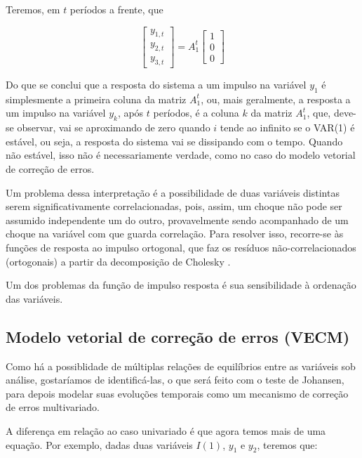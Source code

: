 \documentclass[a4paper,
               article,
               12pt,
               openany,
               oneside,
               english,
               brazil]{abntex2}
\numberwithin{equation}{section}
\begin{document}
    Teremos, em $ t $ períodos a frente, que

    \begin{equation*}
        \begin{bmatrix}
            y_{1,t} \\
            y_{2,t} \\
            y_{3,t}
        \end{bmatrix} =
        A_1^{t}
        \begin{bmatrix}
            1 \\
            0 \\
            0
        \end{bmatrix}
    \end{equation*}

    Do que se conclui que a resposta do sistema a um impulso na variável $ y_1 $ é simplesmente a primeira coluna da matriz $ A_1^{t} $, ou, mais geralmente, a resposta a um impulso na variável $ y_k $, após $ t $ períodos, é a coluna $ k $ da matriz $ A_1^{t} $, que, deve-se observar, vai se aproximando de zero quando $ i $ tende ao infinito se o VAR(1) é estável, ou seja, a resposta do sistema vai se dissipando com o tempo. Quando não estável, isso não é necessariamente verdade, como no caso do modelo vetorial de correção de erros.

   Um problema dessa interpretação é a possibilidade de duas variáveis distintas serem significativamente correlacionadas, pois, assim, um choque não pode ser assumido independente um do outro, provavelmente sendo acompanhado de um choque na variável com que guarda correlação. Para resolver isso, recorre-se às funções de resposta ao impulso ortogonal, que faz os resíduos não-correlacionados (ortogonais) a partir da decomposição de Cholesky \cite[56-62]{lutkepool}.

   Um dos problemas da função de impulso resposta é sua sensibilidade à ordenação das variáveis.

    \subsection{Modelo vetorial de correção de erros (VECM)}

    Como há a possiblidade de múltiplas relações de equilíbrios entre as variáveis sob análise, gostaríamos de identificá-las, o que será feito com o teste de Johansen, para depois modelar suas evoluções temporais como um mecanismo de correção de erros multivariado.

    A diferença em relação ao caso univariado é que agora temos mais de uma equação. Por exemplo, dadas duas variáveis $ I(1) $, $ y_1 $ e $ y_2 $, teremos que:
\end{document}
